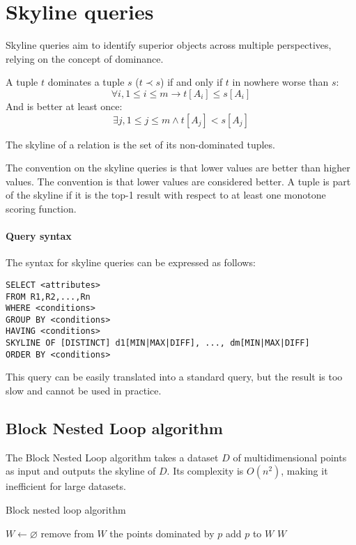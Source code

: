 \section{Skyline queries}

Skyline queries aim to identify superior objects across multiple perspectives, relying on the concept of dominance.
\begin{definition}
    A tuple $t$ dominates a tuple $s$ ($t \prec s$) if and only if $t$ in nowhere worse than $s$: 
    \[\forall i, 1 \leq i \leq m \rightarrow t[A_i] \leq s[A_i]\] 
    And is better at least once: 
    \[\exists j, 1 \leq j \leq m \land t[A_j] < s[A_j]\]
\end{definition}
\begin{definition}    
    The skyline of a relation is the set of its non-dominated tuples.
\end{definition}

The convention on the skyline queries is that lower values are better than higher values.
The convention is that lower values are considered better. 
A tuple is part of the skyline if it is the top-1 result with respect to at least one monotone scoring function. 

\paragraph*{Query syntax}
The syntax for skyline queries can be expressed as follows:
\begin{lstlisting}[style=SQL]
SELECT <attributes>
FROM R1,R2,...,Rn
WHERE <conditions>
GROUP BY <conditions>
HAVING <conditions>
SKYLINE OF [DISTINCT] d1[MIN|MAX|DIFF], ..., dm[MIN|MAX|DIFF]
ORDER BY <conditions>
\end{lstlisting}
This query can be easily translated into a standard query, but the result is too slow and cannot be used in practice. 

\subsection{Block Nested Loop algorithm}
The Block Nested Loop algorithm takes a dataset $D$ of multidimensional points as input and outputs the skyline of $D$. 
Its complexity is $O(n^2)$, making it inefficient for large datasets.
\begin{algorithm}[H]
    \caption{Block nested loop algorithm}
        \begin{algorithmic}[1]
            \State $W \leftarrow \varnothing$
                    \State remove from $W$ the points dominated by $p$
                    \State add $p$ to $W$
                \EndIf
            \EndFor
            \State \Return $W$
        \end{algorithmic}
\end{algorithm}

